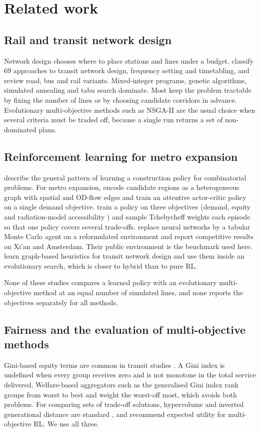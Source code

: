 \section{Related work}\label{sec:related}

\subsection{Rail and transit network design}
Network design chooses where to place stations and lines under a budget. \citet{guihaire2008} classify 69 approaches to transit network design, frequency setting and timetabling, and \citet{farahani2013} review road, bus and rail variants. Mixed-integer programs, genetic algorithms, simulated annealing and tabu search dominate. Most keep the problem tractable by fixing the number of lines or by choosing candidate corridors in advance. Evolutionary multi-objective methods such as NSGA-II \citep{deb2002} are the usual choice when several criteria must be traded off, because a single run returns a set of non-dominated plans.

\subsection{Reinforcement learning for metro expansion}
\citet{bengio2021} describe the general pattern of learning a construction policy for combinatorial problems. For metro expansion, \citet{su2024} encode candidate regions as a heterogeneous graph with spatial and OD-flow edges and train an attentive actor-critic policy on a single demand objective. \citet{zhang2024} train a policy on three objectives (demand, equity and radiation-model accessibility \citep{simini2012}) and sample Tchebycheff weights \citep{zhangli2007} each episode so that one policy covers several trade-offs. \citet{michailidis2026} replace neural networks by a tabular Monte Carlo agent on a reformulated environment and report competitive results on Xi'an and Amsterdam. Their public environment is the benchmark used here. \citet{holliday2025} learn graph-based heuristics for transit network design and use them inside an evolutionary search, which is closer to hybrid than to pure RL.

None of these studies compares a learned policy with an evolutionary multi-objective method at an equal number of simulated lines, and none reports the objectives separately for all methods.

\subsection{Fairness and the evaluation of multi-objective methods}
Gini-based equity terms are common in transit studies \citep{raza2023}. A Gini index is undefined when every group receives zero and is not monotone in the total service delivered. Welfare-based aggregators such as the generalised Gini index \citep{weymark1981} rank groups from worst to best and weight the worst-off most, which avoids both problems. For comparing sets of trade-off solutions, hypervolume and inverted generational distance are standard \citep{zitzler2003,ishibuchi2015}, and \citet{hayes2022} recommend expected utility for multi-objective RL. We use all three.
